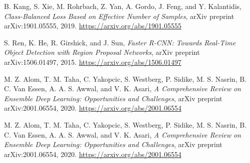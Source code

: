 \documentclass{article}
\begin{document}
\begin{thebibliography}{9}
B. Kang, S. Xie, M. Rohrbach, Z. Yan, A. Gordo, J. Feng, and Y. Kalantidis, 
\textit{Class-Balanced Loss Based on Effective Number of Samples}, 
arXiv preprint arXiv:1901.05555, 2019. 
\url{https://arxiv.org/abs/1901.05555}

S. Ren, K. He, R. Girshick, and J. Sun, 
\textit{Faster R-CNN: Towards Real-Time Object Detection with Region Proposal Networks}, 
arXiv preprint arXiv:1506.01497, 2015. 
\url{https://arxiv.org/abs/1506.01497}

M. Z. Alom, T. M. Taha, C. Yakopcic, S. Westberg, P. Sidike, M. S. Nasrin, B. C. Van Essen, A. A. S. Awwal, and V. K. Asari, 
\textit{A Comprehensive Review on Ensemble Deep Learning: Opportunities and Challenges}, 
arXiv preprint arXiv:2001.06554, 2020. 
\url{https://arxiv.org/abs/2001.06554}

M. Z. Alom, T. M. Taha, C. Yakopcic, S. Westberg, P. Sidike, M. S. Nasrin, B. C. Van Essen, A. A. S. Awwal, and V. K. Asari, 
\textit{A Comprehensive Review on Ensemble Deep Learning: Opportunities and Challenges}, 
arXiv preprint arXiv:2001.06554, 2020. 
\url{https://arxiv.org/abs/2001.06554}

\end{thebibliography}
\end{document}
